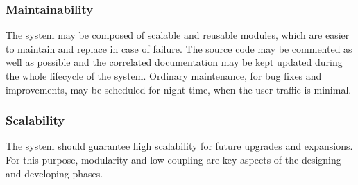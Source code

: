 \subsubsection{Maintainability}
The system may be composed of scalable and reusable modules, which are easier to maintain and replace in case of failure. The source code may be commented as well as possible and the correlated documentation may be kept updated during the whole lifecycle of the system. Ordinary maintenance, for bug fixes and improvements, may be scheduled for night time, when the user traffic is minimal.
\subsubsection{Scalability}
The system should guarantee high scalability for future upgrades and expansions. For this purpose, modularity and low coupling are key aspects of the designing and developing phases.